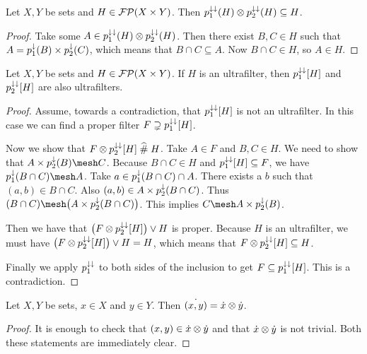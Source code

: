\begin{lemma} \label{filterFactorisationInequality}
Let $X,Y$ be sets and $H \in \operatorname{\mathcal{FP}}(X\times Y)$. Then $p_1^{\downarrow\downarrow}(H)\otimes p_2^{\downarrow\downarrow}(H) \subseteq H$.
\end{lemma}
\begin{proof}
Take some $A\in p_1^{\downarrow\downarrow}(H)\otimes p_2^{\downarrow\downarrow}(H)$. Then there exist $B,C\in H$ such that $A = p_1^\downarrow(B)\times p_2^\downarrow(C)$, which means that $B\cap C\subseteq A$. Now $B\cap C \in H$, so $A\in H$.
\end{proof}

\begin{lemma} \label{projectionsOfUltrafilterAreUltra}
Let $X,Y$ be sets and $H \in \operatorname{\mathcal{FP}}(X\times Y)$. If $H$ is an ultrafilter, then $p_1^{\downarrow\downarrow}[H]$ and $p_2^{\downarrow\downarrow}[H]$ are also ultrafilters.
\end{lemma}
\begin{proof}
Assume, towards a contradiction, that $p_1^{\downarrow\downarrow}[H]$ is not an ultrafilter. In this case we can find a proper filter $F\supsetneq p_1^{\downarrow\downarrow}[H]$.

Now we show that $F\otimes p_2^{\downarrow\downarrow}[H] \mathrel{\widehat{\#}} H$.
Take $A\in F$ and $B, C\in H$. We need to show that $A\times p_2^{\imf}(B) \mesh C$. Because $B\cap C\in H$ and $p_1^{\downarrow\downarrow}[H]\subseteq F$, we have $p_1^\imf(B\cap C)\mesh A$. Take $a\in p_1^\downarrow(B\cap C)\cap A$. There exists a $b$ such that $(a,b)\in B\cap C$. Also $(a,b) \in A\times p_2^\downarrow(B\cap C)$. Thus $(B\cap C) \mesh \big(A\times p_2^\imf(B\cap C)\big)$. This implies $C \mesh A\times p_2^{\imf}(B)$.

Then we have that $\big(F\otimes p_2^{\downarrow\downarrow}[H]\big)\vee H$ is proper. Because $H$ is an ultrafilter, we must have $\big(F\otimes p_2^{\downarrow\downarrow}[H]\big)\vee H = H$, which means that $F\otimes p_2^{\downarrow\downarrow}[H] \subseteq H$.

Finally we apply $p_1^{\downarrow\downarrow}$ to both sides of the inclusion to get $F \subseteq p_1^{\downarrow\downarrow}[H]$. This is a contradiction.
\end{proof}

\begin{lemma} \label{productPrincipalUltrafilter}
Let $X,Y$ be sets, $x\in X$ and $y\in Y$. Then $\dot{(x,y)} = \dot{x} \otimes \dot{y}$.
\end{lemma}
\begin{proof}
It is enough to check that $(x,y)\in\dot{x}\otimes\dot{y}$ and that $\dot{x}\otimes\dot{y}$ is not trivial. Both these statements are immediately clear.
\end{proof}

